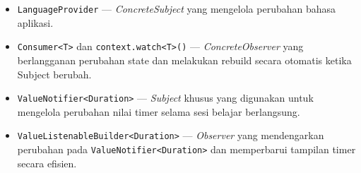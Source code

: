 \documentclass[11pt]{article}
\begin{document}
\begin{itemize}
\begin{itemize}
    \item \texttt{LanguageProvider} --- \textit{ConcreteSubject} yang mengelola perubahan bahasa aplikasi.
    
    \item \texttt{Consumer<T>} dan \texttt{context.watch<T>()} --- \textit{ConcreteObserver} yang berlangganan perubahan state dan melakukan rebuild secara otomatis ketika Subject berubah.
    
    \item \texttt{ValueNotifier<Duration>} --- \textit{Subject} khusus yang digunakan untuk mengelola perubahan nilai timer selama sesi belajar berlangsung.
    
    \item \texttt{ValueListenableBuilder<Duration>} --- \textit{Observer} yang mendengarkan perubahan pada \texttt{ValueNotifier<Duration>} dan memperbarui tampilan timer secara efisien.
\end{itemize}
\end{itemize}
\end{document}
